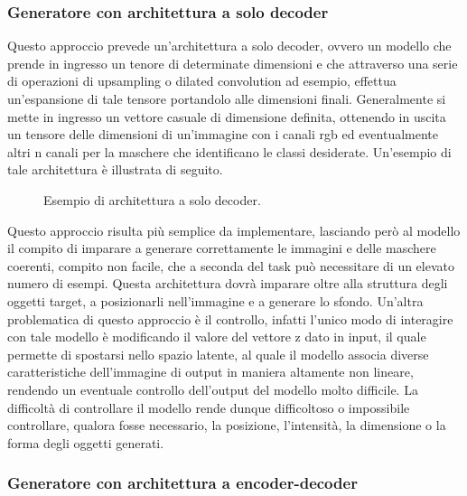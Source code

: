 \subsubsection{Generatore con architettura a solo decoder}

    Questo approccio prevede un'architettura a solo decoder, ovvero un modello che prende in ingresso un tenore di determinate dimensioni e
    che attraverso una serie di operazioni di upsampling o dilated convolution ad esempio, effettua un'espansione di tale tensore
    portandolo alle dimensioni finali. 
    Generalmente si mette in ingresso un vettore casuale di dimensione definita, ottenendo in uscita un tensore delle dimensioni di un'immagine con i canali rgb 
    ed eventualmente altri n canali per la maschere che identificano le classi desiderate.
    Un'esempio di tale architettura è illustrata di seguito.

    \begin{figure}[H]
        \centering
        
        \caption{Esempio di architettura a solo decoder.}
        \label{fig:decoder_only_architecture}
    \end{figure}

    Questo approccio risulta più semplice da implementare, lasciando però al modello il compito di imparare a generare correttamente
    le immagini e delle maschere coerenti, compito non facile, che a seconda del task può necessitare di un elevato numero di esempi. 
    Questa architettura dovrà imparare oltre alla struttura degli oggetti target, a posizionarli nell'immagine e a generare lo sfondo.
    Un'altra problematica di questo approccio è il controllo, infatti l'unico modo di interagire con tale modello è modificando il valore
    del vettore z dato in input, il quale permette di spostarsi nello spazio latente, al quale il modello associa diverse caratteristiche dell'immagine
    di output in maniera altamente non lineare, rendendo un eventuale controllo dell'output del modello molto difficile.
    La difficoltà di controllare il modello rende dunque difficoltoso o impossibile controllare, qualora fosse necessario, la posizione, l'intensità,
    la dimensione o la forma degli oggetti generati.

\subsubsection{Generatore con architettura a encoder-decoder}

